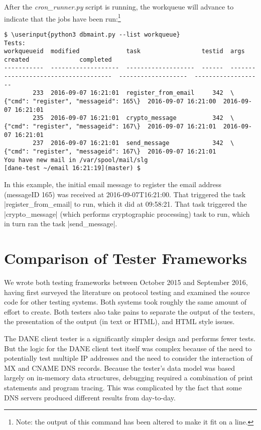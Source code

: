 \documentclass[preprint,3p,11pt]{elsarticle}
\newcommand\userinput[1]{\textbf{#1}}
\begin{document}
After the \emph{cron\_runner.py} script is running, the workqueue will
advance to indicate that the jobs have been run:\footnote{Note: the
  output of this command has been altered to make it fit on a line.}

\begin{Verbatim}[commandchars=\\\{\},fontsize=\tiny]
$ \userinput{python3 dbmaint.py --list workqueue}
Tests:
workqueueid  modified             task                 testid  args                                   created              completed
-----------  -------------------  -------------------  ------  -------------------------------------  -------------------  -------------------
        233  2016-09-07 16:21:01  register_from_email     342  \{"cmd": "register", "messageid": 165\}  2016-09-07 16:21:00  2016-09-07 16:21:01
        235  2016-09-07 16:21:01  crypto_message          342  \{"cmd": "register", "messageid": 167\}  2016-09-07 16:21:01  2016-09-07 16:21:01
        237  2016-09-07 16:21:01  send_message            342  \{"cmd": "register", "messageid": 167\}  2016-09-07 16:21:01
You have new mail in /var/spool/mail/slg
[dane-test ~/email 16:21:19](master) $
\end{Verbatim}

In this example, the initial email message to register the email
address (messageID 165) was received at 2016-09-07T16:21:00. That
triggered the task |register_from_email| to run, which it did at
09:58:21. That task triggered the |crypto_message| (which performs
cryptographic processing) task to run, which in turn ran the task
|send_message|. 


\section{Comparison of Tester Frameworks}

We wrote both testing frameworks between October 2015 and September 2016,
having first surveyed the literature on protocol testing and examined
the source code for other testing systems. Both systems took roughly
the same amount of effort to create. Both testers also take pains to
separate the output of the testers, the presentation of the output (in
text or HTML), and HTML style issues.

The DANE client tester is a significantly simpler design and performs
fewer tests. But the logic for the DANE client test itself was
complex because of the need to potentially test multiple IP addresses
and the need to consider the interaction of MX and CNAME DNS
records. Because the tester's data model was based largely on
in-memory data structures, debugging required a combination of print
statements and program tracing. This was complicated by the fact that
some DNS servers produced different results from day-to-day.
\end{document}
